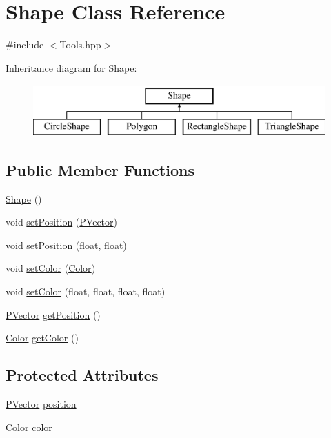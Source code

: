 \hypertarget{class_shape}{}\section{Shape Class Reference}
\label{class_shape}


{\ttfamily \#include $<$Tools.\+hpp$>$}

Inheritance diagram for Shape\+:\begin{figure}[H]
\begin{center}
\leavevmode
\includegraphics[height=2.000000cm]{class_shape}
\end{center}
\end{figure}
\subsection*{Public Member Functions}
\begin{DoxyCompactItemize}
\item 
\hyperlink{class_shape_aaa8d87171e65e0d8ba3c5459978992a7}{Shape} ()
\item 
void \hyperlink{class_shape_a402c108e2d1a078a1974b3ecc7a32fc6}{set\+Position} (\hyperlink{struct_p_vector}{P\+Vector})
\item 
void \hyperlink{class_shape_adeca39958a7adbb8c80f5af9cf5f60bd}{set\+Position} (float, float)
\item 
void \hyperlink{class_shape_aeabb7a6bd05635c30fa56e31766b09bc}{set\+Color} (\hyperlink{struct_color}{Color})
\item 
void \hyperlink{class_shape_a11a5311064e9504e1acfdd91ec94882d}{set\+Color} (float, float, float, float)
\item 
\hyperlink{struct_p_vector}{P\+Vector} \hyperlink{class_shape_a12f4452300d4321762fbf466e37190e0}{get\+Position} ()
\item 
\hyperlink{struct_color}{Color} \hyperlink{class_shape_ab20c5a85d59e7b9d0164158f4ad6c2a4}{get\+Color} ()
\end{DoxyCompactItemize}
\subsection*{Protected Attributes}
\begin{DoxyCompactItemize}
\item 
\hyperlink{struct_p_vector}{P\+Vector} \hyperlink{class_shape_afb4e17803a82f3144777cd249480cb91}{position}
\item 
\hyperlink{struct_color}{Color} \hyperlink{class_shape_ac56e2bf5eb24cf37b6e08c671501566b}{color}
\end{DoxyCompactItemize}


